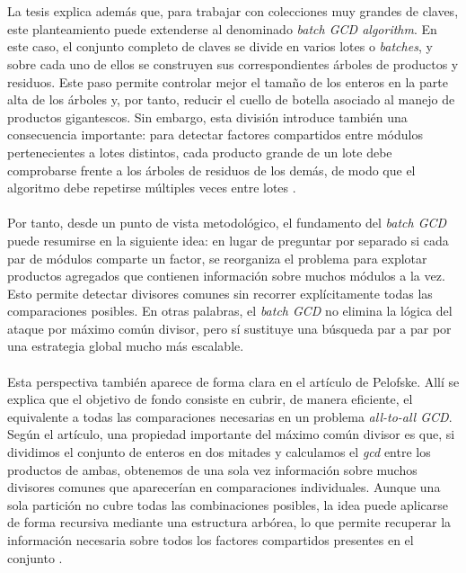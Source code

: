 \\
\\
La tesis explica además que, para trabajar con colecciones muy grandes de claves, este planteamiento puede extenderse al denominado \textit{batch GCD algorithm}. En este caso, el conjunto completo de claves se divide en varios lotes o \textit{batches}, y sobre cada uno de ellos se construyen sus correspondientes árboles de productos y residuos. Este paso permite controlar mejor el tamaño de los enteros en la parte alta de los árboles y, por tanto, reducir el cuello de botella asociado al manejo de productos gigantescos. Sin embargo, esta división introduce también una consecuencia importante: para detectar factores compartidos entre módulos pertenecientes a lotes distintos, cada producto grande de un lote debe comprobarse frente a los árboles de residuos de los demás, de modo que el algoritmo debe repetirse múltiples veces entre lotes \cite{vage2022finding}.
\\
\\
Por tanto, desde un punto de vista metodológico, el fundamento del \textit{batch GCD} puede resumirse en la siguiente idea: en lugar de preguntar por separado si cada par de módulos comparte un factor, se reorganiza el problema para explotar productos agregados que contienen información sobre muchos módulos a la vez. Esto permite detectar divisores comunes sin recorrer explícitamente todas las comparaciones posibles. En otras palabras, el \textit{batch GCD} no elimina la lógica del ataque por máximo común divisor, pero sí sustituye una búsqueda par a par por una estrategia global mucho más escalable.
\\
\\
Esta perspectiva también aparece de forma clara en el artículo de Pelofske. Allí se explica que el objetivo de fondo consiste en cubrir, de manera eficiente, el equivalente a todas las comparaciones necesarias en un problema \textit{all-to-all GCD}. Según el artículo, una propiedad importante del máximo común divisor es que, si dividimos el conjunto de enteros en dos mitades y calculamos el \textit{gcd} entre los productos de ambas, obtenemos de una sola vez información sobre muchos divisores comunes que aparecerían en comparaciones individuales. Aunque una sola partición no cubre todas las combinaciones posibles, la idea puede aplicarse de forma recursiva mediante una estructura arbórea, lo que permite recuperar la información necesaria sobre todos los factores compartidos presentes en el conjunto \cite{pelofske2024efficient}.
\\
